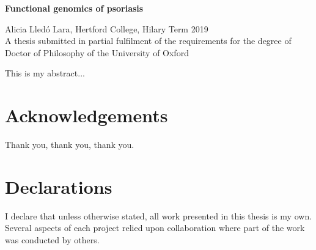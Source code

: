 \begin{center}
{{\bf Functional genomics of psoriasis}} \\
%
\end{center}
\begin{center}

{Alicia Lled\'{o} Lara, Hertford College, Hilary Term 2019}\\
{A thesis submitted in partial fulfilment of the requirements
for the degree of Doctor of Philosophy of the University of Oxford} \\
\end{center}


\noindent
This is my abstract... \\




\newpage
\chapter*{Acknowledgements}
\thispagestyle{plain}
\noindent
%
Thank you, thank you, thank you.

\newpage
\chapter*{Declarations}
\thispagestyle{plain}
\noindent
I declare that unless otherwise stated, all work presented in this thesis is my own. Several aspects of each project relied upon collaboration where part of the work was conducted by others.


